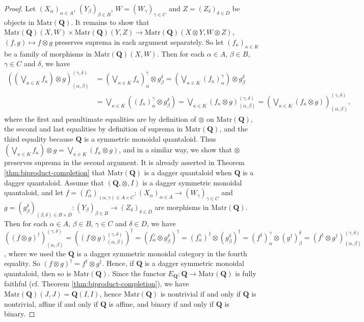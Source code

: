 \documentclass[12pt]{tac}
\theoremstyle{definition}
\theoremstyle{remark}
\newcommand{\<}{\langle}
\renewcommand{\>}{\rangle}
\renewcommand{\:}{\colon}
\begin{document}
\begin{proof}
Let $(X_\alpha)_{\alpha\in A}$, $(Y_\beta)_{\beta\in B}$, $W=(W_\gamma)_{\gamma\in C}$ and $Z=(Z_\delta)_{\delta\in D}$ be objects in $\mathrm{Matr}(\mathbf Q)$. It remains to show that $\mathrm{Matr}(\mathbf Q)(X,W)\times\mathrm{Matr}(\mathbf Q)(Y,Z)\to\mathrm{Matr}(\mathbf Q)(X\otimes Y,W\otimes Z)$, $(f,g)\mapsto f\otimes g$ preserves suprema in each argument separately. So let $(f_\kappa)_{\kappa\in K}$ be a family of morphisms in $\mathrm{Matr}(\mathbf Q)(X,W)$. Then for each $\alpha\in A$, $\beta\in B$, $\gamma\in C$ and $\delta $, we have
\begin{align*}
    \left(\left(\bigvee_{\kappa\in K}f_\kappa\right)\otimes g\right)_{(\alpha,\beta)}^{(\gamma,\delta)} & = \left(\bigvee_{\kappa\in K}f_\kappa\right)_\alpha^\gamma\otimes g_\beta^\delta=\left(\bigvee_{\kappa\in K}(f_\kappa)_\alpha^\gamma\right)\otimes g_\beta^\delta\\
    & = \bigvee_{\kappa\in K}\left((f_\kappa)_{\alpha}^\gamma\otimes g_{\beta}^\delta\right) = \bigvee_{\kappa\in K}(f_\kappa\otimes g)_{(\alpha,\beta)}^{(\gamma,\delta)}=\left(\bigvee_{\kappa\in K}(f_\kappa\otimes g)\right)_{(\alpha,\beta)}^{(\gamma,\delta)},
\end{align*}
where the first and penultimate equalities are by definition of $\otimes$ on $\mathrm{Matr}(\mathbf Q)$, the second and last equalities by definition of suprema in $\mathrm{Matr}(\mathbf Q)$, and the third equality because $\mathbf Q$ is a symmetric monoidal quantaloid. Thus $\left(\bigvee_{\kappa\in K}f_\kappa\right)\otimes g=\bigvee_{\kappa\in K}(f_\kappa\otimes g)$, and in a similar way, we show that $\otimes$ preserves suprema in the second argument. It is already asserted in Theorem \ref{thm:biproduct-completion} that $\mathrm{Matr}(\mathbf Q)$ is a dagger quantaloid when $\mathbf Q$ is a dagger quantaloid. Assume that $(\mathbf Q,\otimes,I)$ is a dagger symmetric monoidal quantaloid, and let $f=(f_{\alpha}^\gamma)_{(\alpha,\gamma)\in A\times C}:(X_\alpha)_{\alpha\in A}\to (W_\gamma)_{\gamma\in C}$ and $g=(g_\beta^\delta)_{(\beta,\delta)\in B\times D}:(Y_\beta)_{\beta\in B}\to(Z_{\delta})_{\delta\in D}$ are morphisms in $\mathrm{Matr}(\mathbf Q)$. Then for each $\alpha\in A$, $\beta\in B$, $\gamma\in C$ and $\delta\in D$, we have $((f\otimes g)^\dag)_{(\alpha,\beta)}^{(\gamma,\delta)}=((f\otimes g)_{(\alpha,\beta)}^{(\gamma,\delta)})^\dag=(f_\alpha^\gamma\otimes g_\beta^\delta)^\dag=( f_\alpha^\gamma)^\dag\otimes (g_\beta^\delta)^\dag=(f^\dag)_\alpha^\gamma\otimes (g^\dag)_\beta^\delta=(f^\dag\otimes g^\dag)_{(\alpha,\beta)}^{(\gamma,\delta)}$, where we used the $\mathbf Q$ is a dagger symmetric monoidal category in the fourth equality. So $(f\otimes g)^\dag=f^\dag\otimes g^\dag$. 
Hence, if $\mathbf Q$ is a dagger symmetric monoidal quantaloid, then so is $\mathrm{Matr}(\mathbf Q)$. Since the functor $E_\mathbf Q:\mathbf Q\to\mathrm{Matr}(\mathbf Q)$ is fully faithful (cf. Theorem \ref{thm:biproduct-completion}), we have $\mathrm{Matr}(\mathbf Q)(J,J)=\mathbf Q(I,I)$, hence $\mathrm{Matr}(\mathbf Q)$ is nontrivial if and only if $\mathbf Q$ is nontrivial, affine if and only if $\mathbf Q$ is affine, and binary if and only if $\mathbf Q$ is binary.


\end{proof}
\end{document}
